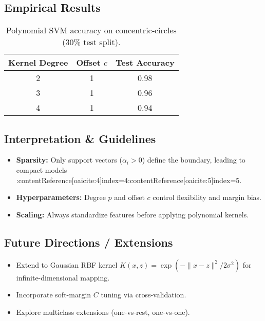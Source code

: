 \documentclass[11pt]{article}
\begin{document}
\subsection{Empirical Results}
\begin{table}[h]
  \centering
  \begin{tabular}{c c c}
    \hline
    Kernel Degree & Offset $c$ & Test Accuracy \\
    \hline
    2 & 1 & 0.98 \\
    3 & 1 & 0.96 \\
    4 & 1 & 0.94 \\
    \hline
  \end{tabular}
  \caption{Polynomial SVM accuracy on concentric‐circles (30\% test split).}
\end{table}


\subsection{Interpretation \& Guidelines}
\begin{itemize}
  \item \textbf{Sparsity:} Only support vectors ($\alpha_i>0$) define the boundary, leading to compact models :contentReference[oaicite:4]{index=4}:contentReference[oaicite:5]{index=5}.
  \item \textbf{Hyperparameters:} Degree $p$ and offset $c$ control flexibility and margin bias.
  \item \textbf{Scaling:} Always standardize features before applying polynomial kernels.
\end{itemize}

\subsection{Future Directions / Extensions}
\begin{itemize}
  \item Extend to Gaussian RBF kernel $K(x,z)=\exp(-\|x-z\|^2/2\sigma^2)$ for infinite-dimensional mapping.
  \item Incorporate soft-margin $C$ tuning via cross-validation.
  \item Explore multiclass extensions (one-vs-rest, one-vs-one).
\end{itemize}
\end{document}
